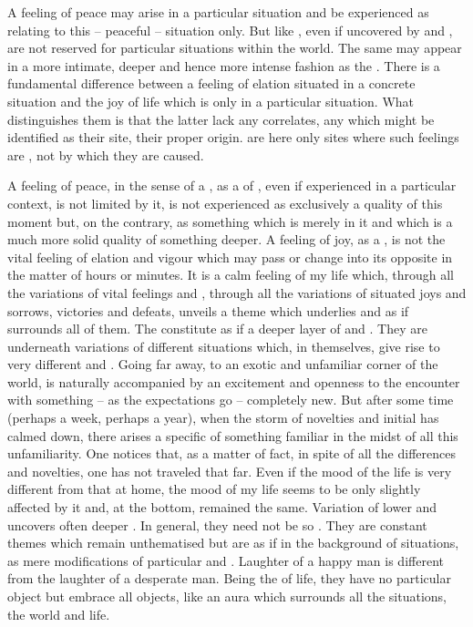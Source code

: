 \pa A feeling of peace may arise in a particular situation and be experienced as
relating to this -- peaceful -- situation only.  But  like
, even if uncovered by  and , are not
reserved for particular situations within the world.  The same 
may appear in a more intimate, deeper and hence more intense fashion as the
. There is a fundamental difference between a feeling of
elation situated in a concrete situation and the joy of life which is only
 in a particular situation.  What distinguishes them is that the
latter lack any  correlates, any 
 which might be identified as their site, their proper origin.
 are here only sites where such feelings are , not
by which they are caused.

A feeling of peace, in the sense of a , as a  of
, even if experienced in a particular context, is not limited by it,
is not experienced as exclusively a quality of this moment but, on the contrary,
as something which is merely  in it and which is a much more
solid quality of something deeper.  A feeling of joy, as a ,
is not the vital feeling of elation and vigour which may pass or change into its
opposite in the matter of hours or minutes. It is a calm feeling of my life which,
through all the variations of vital feelings and , through all the
variations of situated joys and sorrows, victories and defeats, unveils a theme
which underlies and as if surrounds all of them.  The 
constitute as if a deeper layer of  and . They are
 underneath variations of different situations which, in
themselves, give rise to very different  and . Going
far away, to an exotic and unfamiliar corner of the world, is naturally
accompanied by an excitement and openness to the encounter with something -- as
the expectations go -- completely new. But after some time (perhaps a week,
perhaps a year), when the storm of novelties and initial  has
calmed down, there arises a specific  of something familiar in the
midst of all this unfamiliarity.  One notices that, as a matter of fact, in
spite of all the differences and novelties, one has not traveled that far. Even
if the mood of the life  is very different from that at home, the
mood of my life seems to be only slightly affected by it and, at the bottom,
remained the same. Variation of lower  and  uncovers
often deeper . In general, they need not be so .
They are constant themes which remain unthematised but are  as if in
the background of  situations, as mere modifications of particular
 and . Laughter of a happy man is different from the
laughter of a desperate man. Being the  of life, they have no
particular object but embrace all objects, like an aura which surrounds all the
situations, the world and life.

